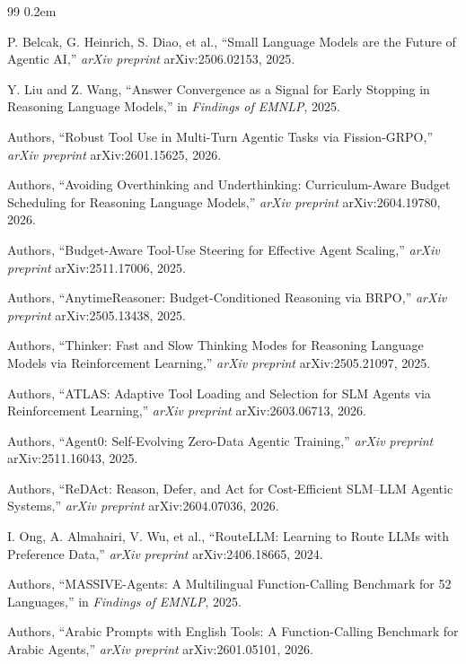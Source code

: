 \documentclass[11pt,a4paper]{article}
\begin{document}
\begin{thebibliography}{99}
\itemsep0.2em

P. Belcak, G. Heinrich, S. Diao, et al., ``Small Language Models are the Future of Agentic AI,'' \textit{arXiv preprint} arXiv:2506.02153, 2025.

Y. Liu and Z. Wang, ``Answer Convergence as a Signal for Early Stopping in Reasoning Language Models,'' in \textit{Findings of EMNLP}, 2025.

Authors, ``Robust Tool Use in Multi-Turn Agentic Tasks via Fission-GRPO,'' \textit{arXiv preprint} arXiv:2601.15625, 2026.

Authors, ``Avoiding Overthinking and Underthinking: Curriculum-Aware Budget Scheduling for Reasoning Language Models,'' \textit{arXiv preprint} arXiv:2604.19780, 2026.

Authors, ``Budget-Aware Tool-Use Steering for Effective Agent Scaling,'' \textit{arXiv preprint} arXiv:2511.17006, 2025.

Authors, ``AnytimeReasoner: Budget-Conditioned Reasoning via BRPO,'' \textit{arXiv preprint} arXiv:2505.13438, 2025.

Authors, ``Thinker: Fast and Slow Thinking Modes for Reasoning Language Models via Reinforcement Learning,'' \textit{arXiv preprint} arXiv:2505.21097, 2025.

Authors, ``ATLAS: Adaptive Tool Loading and Selection for SLM Agents via Reinforcement Learning,'' \textit{arXiv preprint} arXiv:2603.06713, 2026.

Authors, ``Agent0: Self-Evolving Zero-Data Agentic Training,'' \textit{arXiv preprint} arXiv:2511.16043, 2025.

Authors, ``ReDAct: Reason, Defer, and Act for Cost-Efficient SLM--LLM Agentic Systems,'' \textit{arXiv preprint} arXiv:2604.07036, 2026.

I. Ong, A. Almahairi, V. Wu, et al., ``RouteLLM: Learning to Route LLMs with Preference Data,'' \textit{arXiv preprint} arXiv:2406.18665, 2024.

Authors, ``MASSIVE-Agents: A Multilingual Function-Calling Benchmark for 52 Languages,'' in \textit{Findings of EMNLP}, 2025.

Authors, ``Arabic Prompts with English Tools: A Function-Calling Benchmark for Arabic Agents,'' \textit{arXiv preprint} arXiv:2601.05101, 2026.


\end{thebibliography}
\end{document}
